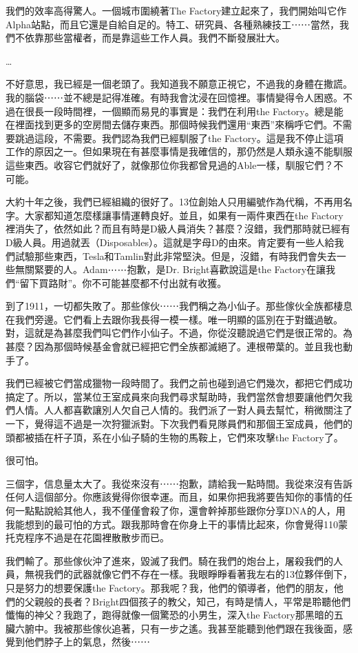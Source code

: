 我們的效率高得驚人。一個城市圍繞著The Factory建立起來了，我們開始叫它作Alpha站點，而且它還是自給自足的。特工、研究員、各種熟練技工⋯⋯當然，我們不依靠那些當權者，而是靠這些工作人員。我們不斷發展壯大。

…

不好意思，我已經是一個老頭了。我知道我不願意正視它，不過我的身體在撒謊。我的腦袋⋯⋯並不總是記得准確。有時我會沈浸在回憶裡。事情變得令人困惑。不過在很長一段時間裡，一個顯而易見的事實是：我們在利用the Factory。總是能在裡面找到更多的空房間去儲存東西。那個時候我們還用“東西”來稱呼它們。不需要跳過這段，不需要。我們認為我們已經馴服了the Factory。這是我不停止這項工作的原因之一。但如果現在有甚麼事情是我確信的，那仍然是人類永遠不能馴服這些東西。收容它們就好了，就像那位你我都曾見過的Able一樣，馴服它們？不可能。

大約十年之後，我們已經組織的很好了。13位創始人只用編號作為代稱，不再用名字。大家都知道怎麼樣讓事情運轉良好。並且，如果有一兩件東西在the Factory裡消失了，依然如此？而且有時是D級人員消失？甚麼？沒錯，我們那時就已經有D級人員。用過就丟（Disposables）。這就是字母D的由來。肯定要有一些人給我們試驗那些東西，Tesla和Tamlin對此非常堅決。但是，沒錯，有時我們會失去一些無關緊要的人。Adam⋯⋯抱歉，是Dr. Bright喜歡說這是the Factory在讓我們“留下買路財”。你不可能甚麼都不付出就有收獲。

到了1911，一切都失敗了。那些傢伙⋯⋯我們稱之為小仙子。那些傢伙全族都棲息在我們旁邊。它們看上去跟你我長得一模一樣。唯一明顯的區別在于對鐵過敏。對，這就是為甚麼我們叫它們作小仙子。不過，你從沒聽說過它們是很正常的。為甚麼？因為那個時候基金會就已經把它們全族都滅絕了。連根帶葉的。並且我也動手了。

我們已經被它們當成獵物一段時間了。我們之前也碰到過它們幾次，都把它們成功搞定了。所以，當某位王室成員來向我們尋求幫助時，我們當然會想要讓他們欠我們人情。人人都喜歡讓別人欠自己人情的。我們派了一對人員去幫忙，稍微關注了一下，覺得這不過是一次狩獵派對。下次我們看見隊員們和那個王室成員，他們的頭都被插在杆子頂，系在小仙子騎的生物的馬鞍上，它們來攻擊the Factory了。

很可怕。

三個字，信息量太大了。我從來沒有⋯⋯抱歉，請給我一點時間。我從來沒有告訴任何人這個部分。你應該覺得你很幸運。而且，如果你把我將要告知你的事情的任何一點點說給其他人，我不僅僅會殺了你，還會幹掉那些跟你分享DNA的人，用我能想到的最可怕的方式。跟我那時會在你身上干的事情比起來，你會覺得110蒙托克程序不過是在花園裡散散步而已。

我們輸了。那些傢伙沖了進來，毀滅了我們。騎在我們的炮台上，屠殺我們的人員，無視我們的武器就像它們不存在一樣。我眼睜睜看著我左右的13位夥伴倒下，只是努力的想要保護the Factory。那我呢？我，他們的領導者，他們的朋友，他們的父親般的長者？Bright四個孩子的教父，知己，有時是情人，平常是聆聽他們懺悔的神父？我跑了，跑得就像一個驚恐的小男生，深入the Factory那黑暗的五臟六腑中。我被那些傢伙追著，只有一步之遙。我甚至能聽到他們跟在我後面，感覺到他們脖子上的氣息，然後⋯⋯

